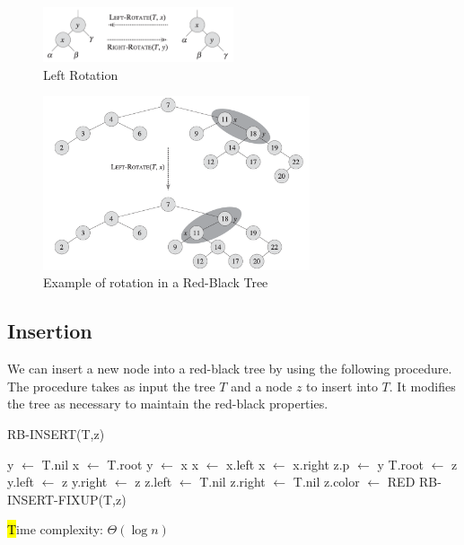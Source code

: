\vspace{-1em}

\begin{figure}[H]
    \centering
    \includegraphics[width=0.5\textwidth]{assets/rotation_rbt.png}
    \caption{Left Rotation}
\end{figure}

\begin{figure}[H]
    \centering
    \includegraphics[width=0.7\textwidth]{assets/rotation_example_rbt.png}
    \caption{Example of rotation in a Red-Black Tree}
\end{figure}

\vspace{-1em}

\subsection*{Insertion}

We can insert a new node into a red-black tree by using the following procedure. The procedure takes as input the tree $T$ and a node $z$ to insert into $T$. It modifies the tree as necessary to maintain the red-black properties.

\begin{algorithm}[H]
    \caption{RB-INSERT(T,z)}
    \begin{algorithmic}[1]
        \State y $\gets$ T.nil
        \State x $\gets$ T.root
            \State y $\gets$ x
                \State x $\gets$ x.left
            \Else
                \State x $\gets$ x.right
            \EndIf
        \EndWhile
        \State z.p $\gets$ y
            \State T.root $\gets$ z
            \State y.left $\gets$ z
        \Else
            \State y.right $\gets$ z
        \EndIf
        \State z.left $\gets$ T.nil
        \State z.right $\gets$ T.nil
        \State z.color $\gets$ RED
        \State RB-INSERT-FIXUP(T,z)
    \end{algorithmic}
    \hl
    Time complexity: $\Theta(\log n)$
\end{algorithm}

